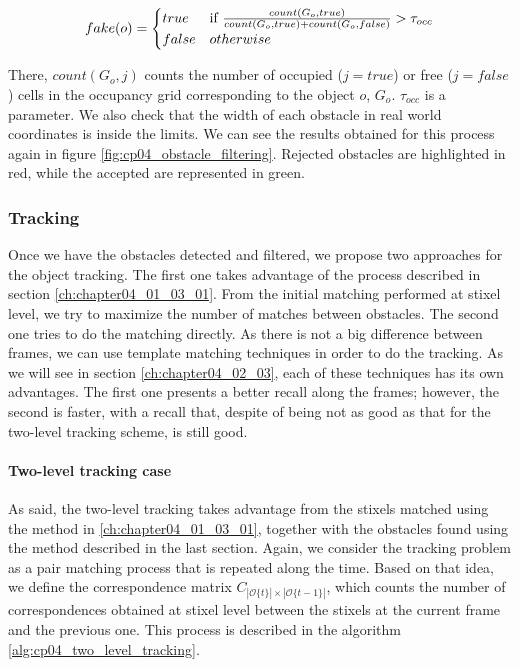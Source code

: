 \begin{equation}\label{eq:cp04_fake_obstacles}
  fake(o) = 
  \begin{align*}
    \begin{cases}
      true & \text{if } {{count(G_o, true)} \over {count(G_o, true) + count(G_o, false)}} > \tau_{occ} \\
      false & otherwise
    \end{cases}
  \end{align*}
\end{equation}

There, $count(G_o, j)$ counts the number of occupied ($j=true$) or free ($j=false$) cells in the occupancy grid corresponding to the object $o$, $G_o$. $\tau_{occ}$ is a parameter. We also check that the width of each obstacle in real world coordinates is inside the limits. We can see the results obtained for this process again in figure \ref{fig:cp04_obstacle_filtering}. Rejected obstacles are highlighted in red, while the accepted are represented in green.

\subsubsection{Tracking}\label{ch:chapter04_01_04_02}

Once we have the obstacles detected and filtered, we propose two approaches for the object tracking. The first one takes advantage of the process described in section \ref{ch:chapter04_01_03_01}. From the initial matching performed at stixel level, we try to maximize the number of matches between obstacles. The second one tries to do the matching directly. As there is not a big difference between frames, we can use template matching techniques in order to do the tracking. As we will see in section \ref{ch:chapter04_02_03}, each of these techniques has its own advantages. The first one presents a better recall along the frames; however, the second is faster, with a recall that, despite of being not as good as that for the two-level tracking scheme, is still good.

\paragraph{Two-level tracking case}\label{ch:chapter04_01_04_02_01}

As said, the two-level tracking takes advantage from the stixels matched using the method in \ref{ch:chapter04_01_03_01}, together with the obstacles found using the method described in the last section. Again, we consider the tracking problem as a pair matching process that is repeated along the time. Based on that idea, we define the correspondence matrix $C_{|\mathcal{O}\{t\}| \times |\mathcal{O}\{t - 1\}|}$, which counts the number of correspondences obtained at stixel level between the stixels at the current frame and the previous one. This process is described in the algorithm \ref{alg:cp04_two_level_tracking}.

